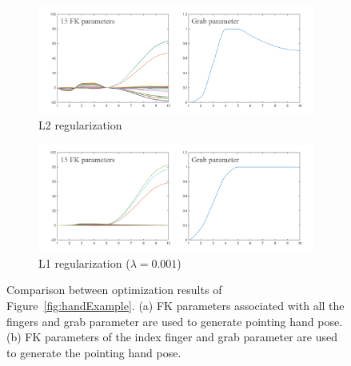 \begin{figure}[!ht]
    \centering
    \begin{subfigure}[b]{0.48\textwidth}
        \includegraphics[width=\textwidth]{images/ls}
        \caption{L2 regularization}
        \label{fig:ls}
    \end{subfigure}
    \begin{subfigure}[b]{0.48\textwidth}
        \includegraphics[width=\textwidth]{images/n1_good}
        \caption{L1 regularization ($\lambda = 0.001$)}
        \label{fig:reg_opt}
    \end{subfigure}
    
    
    \caption{Comparison between optimization results of Figure~\ref{fig:handExample}.
    (a) FK parameters associated with all the fingers and grab parameter are used to generate pointing hand pose.
    (b) FK parameters of the index finger and grab parameter are used to generate the pointing hand pose.
    }
    \label{fig:reg}
\end{figure}

